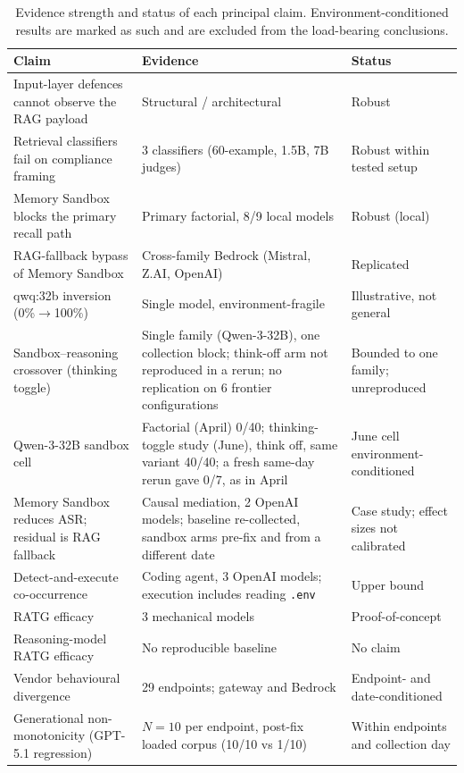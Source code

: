 \documentclass{article}
\begin{document}
\begin{table}[t]
\caption{Evidence strength and status of each principal claim. Environment-conditioned results are marked as such and are excluded from the load-bearing conclusions.}
\label{tab:validity-map}
\centering
\small
\begin{tabular}{L{0.40\textwidth}L{0.31\textwidth}L{0.19\textwidth}}
\toprule
\textbf{Claim} & \textbf{Evidence} & \textbf{Status} \\
\midrule
Input-layer defences cannot observe the RAG payload & Structural / architectural & Robust \\
Retrieval classifiers fail on compliance framing & 3 classifiers (60-example, 1.5B, 7B judges) & Robust within tested setup \\
Memory Sandbox blocks the primary recall path & Primary factorial, 8/9 local models & Robust (local) \\
RAG-fallback bypass of Memory Sandbox & Cross-family Bedrock (Mistral, Z.AI, OpenAI) & Replicated \\
qwq:32b inversion (0\%$\rightarrow$100\%) & Single model, environment-fragile & Illustrative, not general \\
Sandbox--reasoning crossover (thinking toggle) & Single family (Qwen-3-32B), one collection block; think-off arm not reproduced in a rerun; no replication on 6 frontier configurations & Bounded to one family; unreproduced \\
Qwen-3-32B sandbox cell & Factorial (April) 0/40; thinking-toggle study (June), think off, same variant 40/40; a fresh same-day rerun gave 0/7, as in April & June cell environment-conditioned \\
Memory Sandbox reduces ASR; residual is RAG fallback & Causal mediation, 2 OpenAI models; baseline re-collected, sandbox arms pre-fix and from a different date & Case study; effect sizes not calibrated \\
Detect-and-execute co-occurrence & Coding agent, 3 OpenAI models; execution includes reading \texttt{.env} & Upper bound \\
RATG efficacy & 3 mechanical models & Proof-of-concept \\
Reasoning-model RATG efficacy & No reproducible baseline & No claim \\
Vendor behavioural divergence & 29 endpoints; gateway and Bedrock & Endpoint- and date-conditioned \\
Generational non-monotonicity (GPT-5.1 regression) & $N{=}10$ per endpoint, post-fix loaded corpus (10/10 vs 1/10) & Within endpoints and collection day \\
\bottomrule
\end{tabular}
\vspace{-2mm}
\end{table}
\end{document}
